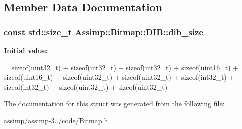 \subsection{Member Data Documentation}
\hypertarget{struct_assimp_1_1_bitmap_1_1_d_i_b_ad0f98723f099af2d3f8cd8c22be83eee}{
\subsubsection[{dib\+\_\+size}]{\setlength{\rightskip}{0pt plus 5cm}const std\+::size\+\_\+t Assimp\+::\+Bitmap\+::\+D\+I\+B\+::dib\+\_\+size\hspace{0.3cm}{\ttfamily [static]}}}\label{struct_assimp_1_1_bitmap_1_1_d_i_b_ad0f98723f099af2d3f8cd8c22be83eee}
{\bfseries Initial value\+:}
\begin{DoxyCode}
=
                \textcolor{keyword}{sizeof}(uint32\_t) + 
                \textcolor{keyword}{sizeof}(int32\_t) +  
                \textcolor{keyword}{sizeof}(int32\_t) +  
                \textcolor{keyword}{sizeof}(uint16\_t) + 
                \textcolor{keyword}{sizeof}(uint16\_t) + 
                \textcolor{keyword}{sizeof}(uint32\_t) + 
                \textcolor{keyword}{sizeof}(uint32\_t) + 
                \textcolor{keyword}{sizeof}(int32\_t) +  
                \textcolor{keyword}{sizeof}(int32\_t) +  
                \textcolor{keyword}{sizeof}(uint32\_t) + 
                \textcolor{keyword}{sizeof}(uint32\_t)
\end{DoxyCode}


The documentation for this struct was generated from the following file\+:\begin{DoxyCompactItemize}
\item 
assimp/assimp-\/3../code/\hyperlink{_bitmap_8h}{Bitmap.\+h}\end{DoxyCompactItemize}
